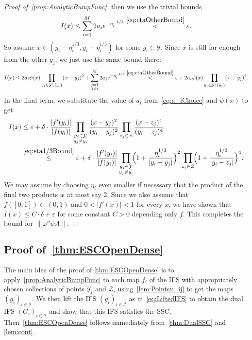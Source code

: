 \documentclass[11pt,a4paper]{article}
\def\cref#1{\ref{#1}}%
\theoremstyle{definition}
\theoremstyle{remark}
\newcommand{\0}{\mathbf{0}}
\numberwithin{equation}{section}
\begin{document}
\begin{proof}[Proof of~\cref{prop:AnalyticBumpFunc}]
then we use the trivial bounds
\begin{equation*}
	I(x) \leq \sum_{i=1}^{M} 2a_ie^{-\eta_i^{-1/3}} \stackrel{\eqref{eq:etaOtherBound}}{<} \varepsilon.
\end{equation*}
So assume $x\in(y_i-\eta_i^{1/3}, y_i+\eta_i^{1/3})$ for some $y_i\in\mathcal{Y}$. Since $x$ is
still far enough from the other $y_j$, we just use the same bound there:
\begin{equation*}
	I(x) \leq 2a_i \psi(x) \prod_{y_j\in\mathcal{Y}\setminus\{y_i\}} (x-y_j)^2 +
	\sum_{\substack{j=1 \\ j\neq i}}^{M} 2a_j e^{-\eta_j^{-1/3}}
	\stackrel{\eqref{eq:etaOtherBound}}{<} \varepsilon + 2a_i \psi(x)
	\prod_{y_j\in\mathcal{Y}\setminus\{y_i\}} (x-y_j)^2.
\end{equation*}
In the final term, we substitute the value of $a_i$ from~\cref{eq:a_iChoice} and $\psi(x)$ to get
\begin{align*}
	I(x)&\leq \varepsilon+ \delta \cdot \frac{|f'(y_i)|}{|f(y_i)|} \prod_{\substack{y_j\in\mathcal{Y} \\
	y_j\neq y_i}} \frac{(x-y_j)^2}{(y_i - y_j)^2}  \prod_{z_j\in\mathcal{Z}}
	\frac{(x-z_j)^4}{(y_i - z_j)^4} \\
	&\stackrel{\eqref{eq:eta1/3Bound}}{\leq}  \varepsilon+  \delta \cdot
	\frac{|f'(y_i)|}{|f(y_i)|}\prod_{\substack{y_j\in\mathcal{Y} \\ y_j\neq y_i}}\!\! \Big(
	1+\frac{\eta_i^{1/3}}{|y_i-y_j|} \Big)^2 \prod_{z_j\in\mathcal{Z}}\!\! \Big(
      1+\frac{\eta_i^{1/3}}{|y_i-z_j|} \Big)^4. 
\end{align*}
We may assume by choosing $\eta_i$ even smaller if necessary that the product of the final two
products is at most say 2. Since we also assume that $f([0,1])\subset (0,1)$ and $0<|f'(x)|<1$ for
every $x$, we have shown that $I(x)\leq C\cdot\delta+\varepsilon$ for some constant $C>0$ depending
only $f$. This completes the bound for $\| \varphi'' \psi A\|$. 
\end{proof}

\subsection{Proof of~\cref{thm:ESCOpenDense}}

The main idea of the proof of \cref{thm:ESCOpenDense} is to apply~\cref{prop:AnalyticBumpFunc} to
each map $f_i$ of the IFS with appropriately chosen collections of points $\mathcal{Y}_i$ and
$\mathcal{Z}_i$ using~\cref{lem:Pointsx_ij} to get the maps $(g_i)_{i\in\mathcal{I}}$. We then lift
the IFS $(g_i)_{i\in\mathcal{I}}$ as in~\cref{eq:LiftedIFS} to obtain the dual IFS
$(G_i)_{i\in\mathcal{I}}$ and show that this
IFS satisfies the SSC. Then~\cref{thm:ESCOpenDense} follows immediately from~\cref{thm:DualSSC} and
\cref{lem:cont}.
\end{document}
